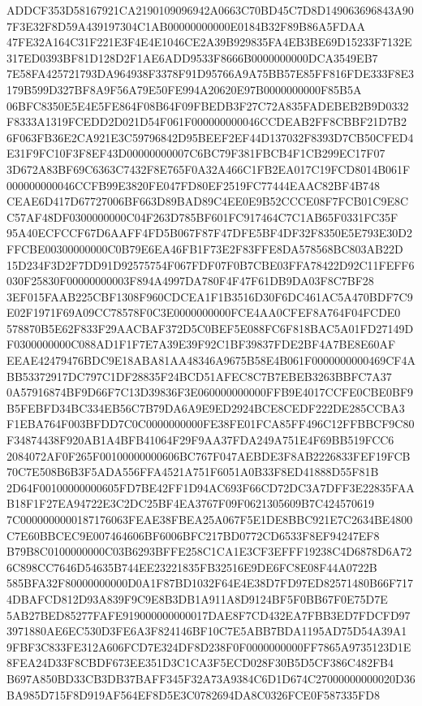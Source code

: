 \documentclass[UTF8,fontset=fandol,zihao=-4,a4paper]{ctexart}
\begin{document}
{{ADDCF353D58167921CA2190109096942A0663C70BD45C7D8D149063696843A907F3E32F8D59A439197304C1AB00000000000E0184B32F89B86A5FDAA
47FE32A164C31F221E3F4E4E1046CE2A39B929835FA4EB3BE69D15233F7132E317ED0393BF81D128D2F1AE6ADD9533F8666B0000000000DCA3549EB7
7E58FA425721793DA964938F3378F91D95766A9A75BB57E85FF816FDE333F8E3179B599D327BF8A9F56A79E50FE994A20620E97B0000000000F85B5A
06BFC8350E5E4E5FE864F08B64F09FBEDB3F27C72A835FADEBEB2B9D0332F8333A1319FCEDD2D021D54F061F000000000046CCDEAB2FF8CBBF21D7B2
6F063FB36E2CA921E3C59796842D95BEEF2EF44D137032F8393D7CB50CFED4E31F9FC10F3F8EF43D00000000007C6BC79F381FBCB4F1CB299EC17F07
3D672A83BF69C6363C7432F8E765F0A32A466C1FB2EA017C19FCD8014B061F000000000046CCFB99E3820FE047FD80EF2519FC77444EAAC82BF4B748
CEAE6D417D67727006BF663D89BAD89C4EE0E9B52CCCE08F7FCB01C9E8CC57AF48DF0300000000C04F263D785BF601FC917464C7C1AB65F0331FC35F
95A40ECFCCF67D6AAFF4FD5B067F87F47DFE5BF4DF32F8350E5E793E30D2FFCBE00300000000C0B79E6EA46FB1F73E2F83FFE8DA578568BC803AB22D
15D234F3D2F7DD91D92575754F067FDF07F0B7CBE03FFA78422D92C11FEFF6030F25830F00000000003F894A4997DA780F4F47F61DB9DA03F8C7BF28
3EF015FAAB225CBF1308F960CDCEA1F1B3516D30F6DC461AC5A470BDF7C9E02F1971F69A09CC78578F0C3E0000000000FCE4AA0CFEF8A764F04FCDE0
578870B5E62F833F29AACBAF372D5C0BEF5E088FC6F818BAC5A01FD27149DF0300000000C088AD1F1F7E7A39E39F92C1BF39837FDE2BF4A7BE8E60AF
EEAE42479476BDC9E18ABA81AA48346A9675B58E4B061F0000000000469CF4ABB53372917DC797C1DF28835F24BCD51AFEC8C7B7EBEB3263BBFC7A37
0A57916874BF9D66F7C13D39836F3E060000000000FFB9E4017CCFE0CBE0BF9B5FEBFD34BC334EB56C7B79DA6A9E9ED2924BCE8CEDF222DE285CCBA3
F1EBA764F003BFDD7C0C0000000000FE38FE01FCA85FF496C12FFBBCF9C80F34874438F920AB1A4BFB41064F29F9AA37FDA249A751E4F69BB519FCC6
2084072AF0F265F00100000000606BC767F047AEBDE3F8AB2226833FEF19FCB70C7E508B6B3F5ADA556FFA4521A751F6051A0B33F8ED41888D55F81B
2D64F00100000000605FD7BE42FF1D94AC693F66CD72DC3A7DFF3E22835FAAB18F1F27EA94722E3C2DC25BF4EA3767F09F0621305609B7C424570619
7C0000000000187176063FEAE38FBEA25A067F5E1DE8BBC921E7C2634BE4800C7E60BBCEC9E007464606BF6006BFC217BD0772CD6533F8EF94247EF8
B79B8C0100000000C03B6293BFFE258C1CA1E3CF3EFFF19238C4D6878D6A726C898CC7646D54635B744EE23221835FB32516E9DE6FC8E08F44A0722B
585BFA32F80000000000D0A1F87BD1032F64E4E38D7FD97ED82571480B66F7174DBAFCD812D93A839F9C9E8B3DB1A911A8D9124BF5F0BB67F0E75D7E
5AB27BED85277FAFE919000000000017DAE8F7CD432EA7FBB3ED7FDCFD973971880AE6EC530D3FE6A3F824146BF10C7E5ABB7BDA1195AD75D54A39A1
9FBF3C833FE312A606FCD7E324DF8D238F0F0000000000FF7865A9735123D1E8FEA24D33F8CBDF673EE351D3C1CA3F5ECD028F30B5D5CF386C482FB4
B697A850BD33CB3DB37BAFF345F32A73A9384C6D1D674C27000000000020D36BA985D715F8D919AF564EF8D5E3C0782694DA8C0326FCE0F587335FD8
}}
\end{document}
